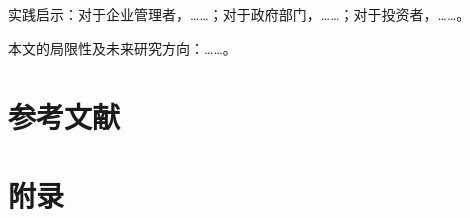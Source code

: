 \documentclass[10pt, UTF8, twocolumn]{ctexart}
\begin{document}
实践启示：对于企业管理者，……；对于政府部门，……；对于投资者，……。

本文的局限性及未来研究方向：……。

\section*{参考文献}


\clearpage
\appendix
\section*{附录}
\end{document}
